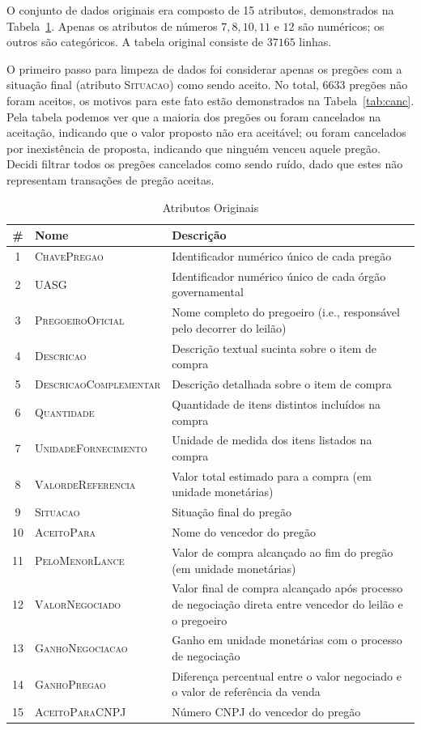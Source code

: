 \documentclass[brazil,a4paper,12pt]{article}
\begin{document}
O conjunto de dados originais era composto de 15 atributos, demonstrados na Tabela~\ref{tab:orig}. Apenas os atributos de números $7, 8, 10, 11$ e $12$ são numéricos; os outros são categóricos. A tabela original consiste de $37165$ linhas.

O primeiro passo para limpeza de dados foi considerar apenas os pregões com a situação final (atributo \textsc{Situacao}) como sendo aceito. No total, $6633$ pregões não foram aceitos, os motivos para este fato estão demonstrados na Tabela~\ref{tab:canc}. Pela tabela podemos ver que a maioria dos pregões ou foram cancelados na aceitação, indicando que o valor proposto não era aceitável; ou foram cancelados por inexistência de proposta, indicando que ninguém venceu aquele pregão. Decidi filtrar todos os pregões cancelados como sendo ruído, dado que estes não representam transações de pregão aceitas.


\begin{table}
\centering
\small
\begin{tabular}{clp{10cm}}
\toprule
\# & Nome & Descrição \\
\midrule
1 & \textsc{ChavePregao} & Identificador numérico único de cada pregão \\
\midrule
2 & \textsc{UASG} & Identificador numérico único de cada órgão governamental \\
\midrule
3 & \textsc{PregoeiroOficial} & Nome completo do pregoeiro (i.e., responsável pelo decorrer do leilão) \\
\midrule
4 & \textsc{Descricao} & Descrição textual sucinta sobre o item de compra \\
\midrule
5 & \textsc{DescricaoComplementar} & Descrição detalhada sobre o item de compra \\
\midrule
6 & \textsc{Quantidade} & Quantidade de itens distintos incluídos na compra \\
\midrule
7 & \textsc{UnidadeFornecimento} & Unidade de medida dos itens listados na compra \\
\midrule
8 & \textsc{ValordeReferencia} & Valor total estimado para a compra (em unidade monetárias) \\
\midrule
9 & \textsc{Situacao} & Situação final do pregão \\
\midrule
10 & \textsc{AceitoPara} & Nome do vencedor do pregão \\
\midrule
11 & \textsc{PeloMenorLance} & Valor de compra alcançado ao fim do pregão (em unidade monetárias) \\
\midrule
12 & \textsc{ValorNegociado} & Valor final de compra alcançado após processo de negociação direta entre vencedor do leilão e o pregoeiro \\
\midrule	
13 & \textsc{GanhoNegociacao} & Ganho em unidade monetárias com o processo de negociação \\
\midrule
14 & \textsc{GanhoPregao} & Diferença percentual entre o valor negociado e o valor de referência da venda\\
\midrule
15 & \textsc{AceitoParaCNPJ} & Número CNPJ do vencedor do pregão \\
\bottomrule
\end{tabular}
\caption{Atributos Originais}
\label{tab:orig}
\end{table}
\end{document}
